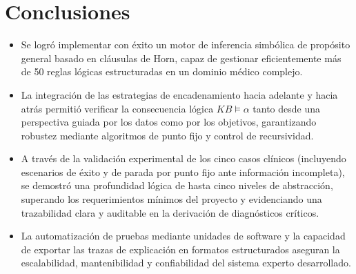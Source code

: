 \documentclass[11pt,a4paper]{article}
\begin{document}
\section{Conclusiones}
\begin{itemize}
    \item Se logró implementar con éxito un motor de inferencia simbólica de propósito general basado en cláusulas de Horn, capaz de gestionar eficientemente más de 50 reglas lógicas estructuradas en un dominio médico complejo.
    \item La integración de las estrategias de encadenamiento hacia adelante y hacia atrás permitió verificar la consecuencia lógica $KB \models \alpha$ tanto desde una perspectiva guiada por los datos como por los objetivos, garantizando robustez mediante algoritmos de punto fijo y control de recursividad.
    \item A través de la validación experimental de los cinco casos clínicos (incluyendo escenarios de éxito y de parada por punto fijo ante información incompleta), se demostró una profundidad lógica de hasta cinco niveles de abstracción, superando los requerimientos mínimos del proyecto y evidenciando una trazabilidad clara y auditable en la derivación de diagnósticos críticos.
    \item La automatización de pruebas mediante unidades de software y la capacidad de exportar las trazas de explicación en formatos estructurados aseguran la escalabilidad, mantenibilidad y confiabilidad del sistema experto desarrollado.
\end{itemize}
\end{document}
